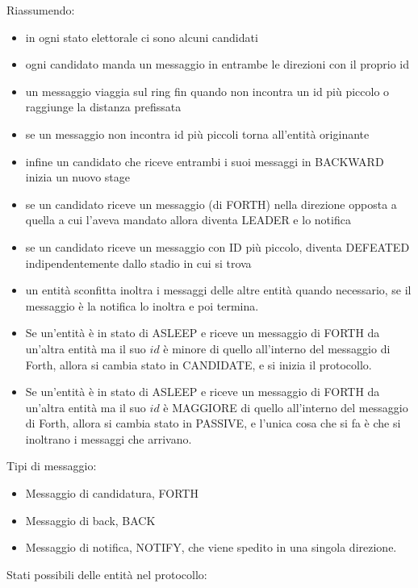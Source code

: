 Riassumendo:
\begin{itemize}
    \item in ogni stato elettorale ci sono alcuni candidati
    \item ogni candidato manda un messaggio in entrambe le direzioni con il
          proprio id
    \item un messaggio viaggia sul ring fin quando non incontra un id più piccolo
          o raggiunge la distanza prefissata
    \item se un messaggio non incontra id più piccoli torna all'entità originante
    \item infine un candidato che riceve entrambi i suoi messaggi in BACKWARD
          inizia un nuovo stage
    \item se un candidato riceve un messaggio (di FORTH) nella direzione opposta a
          quella a cui l'aveva mandato allora diventa LEADER e lo notifica
    \item se un candidato riceve un messaggio con ID più piccolo, diventa DEFEATED
          indipendentemente dallo stadio in cui si trova
    \item un entità sconfitta inoltra i messaggi delle altre entità quando
          necessario, se il messaggio è la notifica lo inoltra e poi termina.
    \item Se un'entità è in stato di ASLEEP e riceve un messaggio di FORTH da
          un'altra entità ma il suo $id$ è minore di quello all'interno del messaggio di
          Forth, allora si cambia stato in CANDIDATE, e si inizia il protocollo.
    \item Se un'entità è in stato di ASLEEP e riceve un messaggio di FORTH da
          un'altra entità ma il suo $id$ è MAGGIORE di quello all'interno del messaggio
          di Forth, allora si cambia stato in PASSIVE, e l'unica cosa che si fa è che si
          inoltrano i messaggi che arrivano.

\end{itemize}

Tipi di messaggio:
\begin{itemize}
    \item Messaggio di candidatura, FORTH
    \item Messaggio di back, BACK
    \item Messaggio di notifica, NOTIFY, che viene spedito in una singola
          direzione.
\end{itemize}

Stati possibili delle entità nel protocollo:

